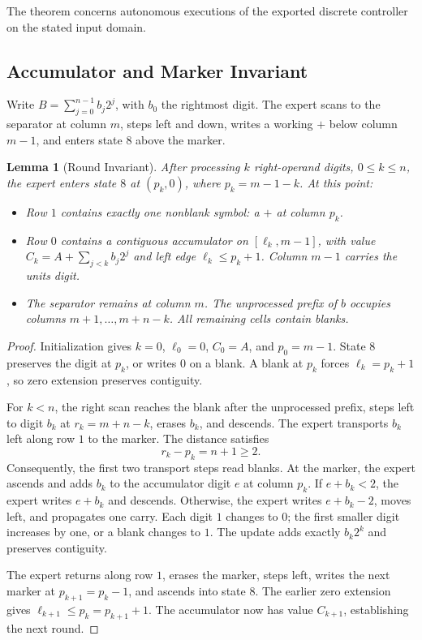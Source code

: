 \documentclass[11pt,a4paper]{article}
\newtheorem{lemma}{Lemma}
\newcommand{\sectiontitle}[2]{\refstepcounter{section}\vspace*{2pt}{\LARGE\bfseries\color{Teal}\thesection\quad #2}\par\vspace{7pt}}
\begin{document}
The theorem concerns autonomous executions of the exported discrete controller
on the stated input domain.
\clearpage
\sectiontitle{2 \enspace EXPERT BEHAVIOR}{Expert Behavior}\label{sec:common2}
\subsection{Accumulator and Marker Invariant}\label{sec:part1}
Write $B=\sum_{j=0}^{n-1}b_j2^j$, with $b_0$ the rightmost digit.
The expert scans to the separator at column $m$, steps left and down,
writes a working $+$ below column $m-1$, and enters state $8$ above the marker.

\begin{lemma}[Round Invariant]\label{lem:invariant}
After processing $k$ right-operand digits, $0\le k\le n$, the expert enters
state $8$ at $(p_k,0)$, where $p_k=m-1-k$. At this point:
\begin{itemize}
\item Row $1$ contains exactly one nonblank symbol: a $+$ at column $p_k$.
\item Row $0$ contains a contiguous accumulator on $[\ell_k,m-1]$, with value
$C_k=A+\sum_{j<k}b_j2^j$ and left edge $\ell_k\le p_k+1$.
Column $m-1$ carries the units digit.
\item The separator remains at column $m$. The unprocessed prefix of $b$
occupies columns $m+1,\ldots,m+n-k$. All remaining cells contain blanks.
\end{itemize}
\end{lemma}
\begin{proof}
Initialization gives $k=0$, $\ell_0=0$, $C_0=A$, and $p_0=m-1$.
State $8$ preserves the digit at $p_k$, or writes $0$ on a blank.
A blank at $p_k$ forces $\ell_k=p_k+1$, so zero extension preserves contiguity.

For $k<n$, the right scan reaches the blank after the unprocessed prefix,
steps left to digit $b_k$ at $r_k=m+n-k$, erases $b_k$, and descends.
The expert transports $b_k$ left along row $1$ to the marker. The distance satisfies
\[
r_k-p_k=n+1\ge2. \tag{1}
\]
Consequently, the first two transport steps read blanks. At the marker, the
expert ascends and adds $b_k$ to the accumulator digit $e$ at column $p_k$.
If $e+b_k<2$, the expert writes $e+b_k$ and descends. Otherwise, the expert
writes $e+b_k-2$, moves left, and propagates one carry. Each digit $1$
changes to $0$; the first smaller digit increases by one, or a blank changes
to $1$. The update adds exactly $b_k2^k$ and preserves contiguity.

The expert returns along row $1$, erases the marker, steps left, writes the
next marker at $p_{k+1}=p_k-1$, and ascends into state $8$.
The earlier zero extension gives $\ell_{k+1}\le p_k=p_{k+1}+1$.
The accumulator now has value $C_{k+1}$, establishing the next round.
\end{proof}
\end{document}
